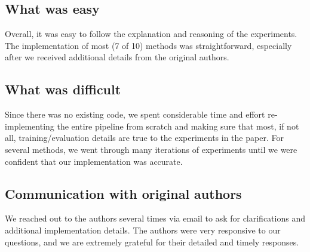 \subsection*{What was easy}
Overall, it was easy to follow the explanation and reasoning of the experiments. The implementation of most (7 of 10) methods was straightforward, especially after we received additional details from the original authors.

\subsection*{What was difficult}
Since there was no existing code, we spent considerable time and effort re-implementing the entire pipeline from scratch and making sure that most, if not all, training/evaluation details are true to the experiments in the paper. For several methods, we went through many iterations of experiments until we were confident that our implementation was accurate.

\subsection*{Communication with original authors}
We reached out to the authors several times via email to ask for clarifications and additional implementation details. The authors were very responsive to our questions, and we are extremely grateful for their detailed and timely responses.